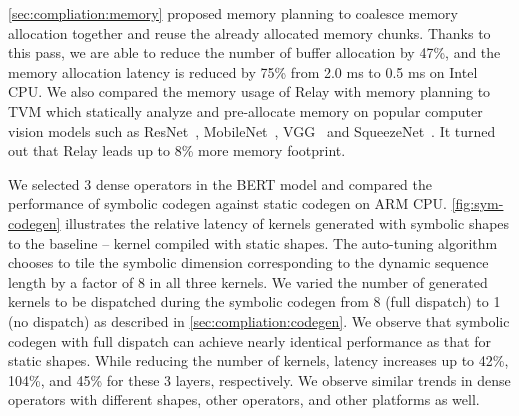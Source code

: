 
\autoref{sec:compliation:memory} proposed memory planning to coalesce memory allocation together and reuse the already allocated memory chunks. Thanks to this pass, we are able to reduce the number of buffer allocation by 47\%, and the memory allocation latency is reduced by 75\% from 2.0 ms to 0.5 ms on Intel CPU. We also compared the memory usage of Relay with memory planning to TVM which statically analyze and pre-allocate memory on popular computer vision models such as ResNet~\citep{he2016deep}, MobileNet~\citep{howard2017mobilenets}, VGG~\citep{simonyan2014very} and SqueezeNet~\citep{iandola2016squeezenet}. It turned out that Relay leads up to 8\% more memory footprint.

 We selected 3 dense operators in the BERT model and compared the performance of symbolic codegen against static codegen on ARM CPU.
\autoref{fig:sym-codegen} illustrates the relative latency of kernels generated with symbolic shapes to the baseline -- kernel compiled with static shapes. The auto-tuning algorithm chooses to tile the symbolic dimension corresponding to the dynamic sequence length by a factor of 8 in all three kernels. We varied the number of generated kernels to be dispatched during the symbolic codegen from 8 (full dispatch) to 1 (no dispatch) as described in \autoref{sec:compliation:codegen}. We observe that symbolic codegen with full dispatch can achieve nearly identical performance as that for static shapes. While reducing the number of kernels, latency increases up to 42\%, 104\%, and 45\% for these 3 layers, respectively.
We observe similar trends in dense operators with different shapes, other operators, and other platforms as well.



